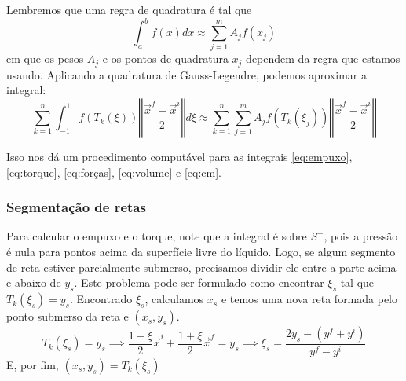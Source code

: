 \documentclass[
	12pt,				%
	oneside,			%
	a4paper,			%
	]{article}
\begin{document}
    Lembremos que uma regra de quadratura é tal que 
    \[
        \int_{a}^{b} f(x) dx \approx \sum_{j=1}^{m} A_j f(x_j)
    \]
    em que os pesos $A_j$ e os pontos de quadratura $x_j$ dependem da regra que estamos usando. Aplicando a quadratura de Gauss-Legendre, podemos aproximar a integral:
    \begin{equation}
        \sum_{k=1}^{n} \int^1_{-1} f(T_k(\xi)) \left\Vert \frac{\vec{x}^f - \vec{x}^i}{2} \right\Vert d \xi \approx \sum_{k=1}^{n} \sum_{j=1}^{m} A_j f(T_k(\xi_j)) \left\Vert \frac{\vec{x}^f - \vec{x}^i}{2} \right\Vert
        \label{eq:quad}
    \end{equation}

    Isso nos dá um procedimento computável para as integrais \ref{eq:empuxo}, \ref{eq:torque}, \ref{eq:forças}, \ref{eq:volume} e \ref{eq:cm}.

    \subsubsection{Segmentação de retas}
    Para calcular o empuxo e o torque, note que a integral é sobre $S^-$, pois a pressão é nula para pontos acima da superfície livre do líquido. Logo, se algum segmento de reta estiver parcialmente submerso, precisamos dividir ele entre a parte acima e abaixo de $y_s$. Este problema pode ser formulado como encontrar $\xi_s$ tal que $T_k(\xi_s) = y_s$. Encontrado $\xi_s$, calculamos $x_s$ e temos uma nova reta formada pelo ponto submerso da reta e $(x_s, y_s)$.
    \[
        T_k(\xi_s) = y_s \implies \frac{1-\xi}{2}\vec{x}^i + \frac{1 + \xi}{2} \vec{x}^f = y_s \implies \xi_s = \frac{2y_s - (y^f + y^i)}{y^f - y^i}
    \]
    E, por fim, $(x_s, y_s) = T_k(\xi_s)$
\end{document}
